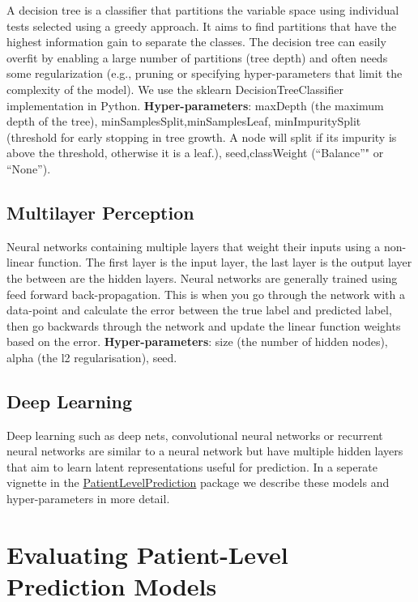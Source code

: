 \documentclass[11pt]{book}
\theoremstyle{definition}
\theoremstyle{definition}
\theoremstyle{definition}
\theoremstyle{remark}
\begin{document}
A decision tree is a classifier that partitions the variable space using individual tests selected using a greedy approach. It aims to find partitions that have the highest information gain to separate the classes. The decision tree can easily overfit by enabling a large number of partitions (tree depth) and often needs some regularization (e.g., pruning or specifying hyper-parameters that limit the complexity of the model). We use the sklearn DecisionTreeClassifier implementation in Python. \textbf{Hyper-parameters}: maxDepth (the maximum depth of the tree), minSamplesSplit,minSamplesLeaf, minImpuritySplit (threshold for early stopping in tree growth. A node will split if its impurity is above the threshold, otherwise it is a leaf.), seed,classWeight (``Balance''" or ``None'').

\hypertarget{multilayer-perception}{%
\subsection{Multilayer Perception}\label{multilayer-perception}}

Neural networks containing multiple layers that weight their inputs using a non-linear function. The first layer is the input layer, the last layer is the output layer the between are the hidden layers. Neural networks are generally trained using feed forward back-propagation. This is when you go through the network with a data-point and calculate the error between the true label and predicted label, then go backwards through the network and update the linear function weights based on the error. \textbf{Hyper-parameters}: size (the number of hidden nodes), alpha (the l2 regularisation), seed.

\hypertarget{deep-learning}{%
\subsection{Deep Learning}\label{deep-learning}}

Deep learning such as deep nets, convolutional neural networks or recurrent neural networks are similar to a neural network but have multiple hidden layers that aim to learn latent representations useful for prediction. In a seperate vignette in the \href{https://ohdsi.github.io/PatientLevelPrediction/}{PatientLevelPrediction} package we describe these models and hyper-parameters in more detail.

\hypertarget{evalaution}{%
\section{Evaluating Patient-Level Prediction Models}\label{evalaution}}
\end{document}
